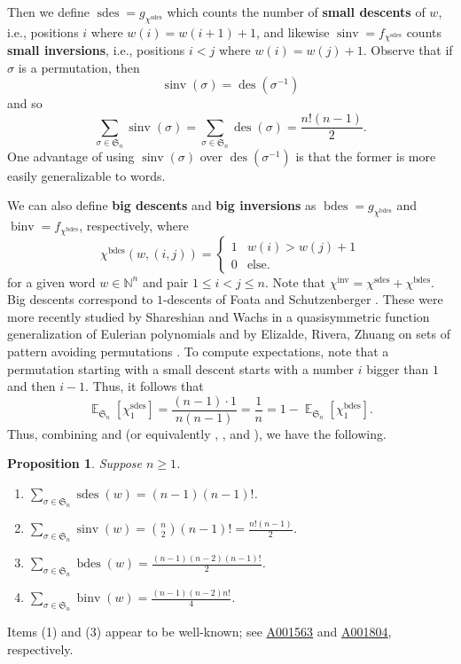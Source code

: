 \documentclass{amsart}
\newcommand{\seqnum}[1]{\href{http://oeis.org/#1}{\underline{#1}}}
\newcommand{\N}{\mathbb{N}}
\renewcommand{\S}{\mathfrak{S}}
\DeclareMathOperator{\des}{des}
\DeclareMathOperator{\inv}{inv}
\DeclareMathOperator{\sinv}{sinv}
\DeclareMathOperator{\sdes}{sdes}
\DeclareMathOperator{\bdes}{bdes}
\DeclareMathOperator{\binv}{binv}
\DeclareMathOperator{\E}{\mathbb{E}}
\newtheorem{proposition}[theorem]{Proposition}
\theoremstyle{definition}
\begin{document}
Then we define $\sdes= g_{\chi^{\sdes}}$
which counts the number of \textbf{small descents} of $w$, i.e., positions $i$ where $w(i)=w(i+1)+1$, and likewise $\sinv=f_{\chi^{\sdes}}$ counts \textbf{small inversions}, i.e., positions $i<j$ where $w(i)=w(j)+1$. Observe that if $\sigma$ is a permutation, then 
\begin{equation}\label{eq:sinv-equals-ides}\sinv(\sigma)=\des(\sigma^{-1})\end{equation}
and so 
\begin{equation}\label{eq:sum-sinv-equals-ides}\sum_{\sigma\in \S_n}\sinv(\sigma)=\sum_{\sigma\in \S_n}\des(\sigma)=\frac{n!(n-1)}{2}.\end{equation}
One advantage of using $\sinv(\sigma)$ over $\des(\sigma^{-1})$ is that the former is more easily generalizable to words. 

We can also define \textbf{big descents} and \textbf{big inversions} as $\bdes=g_{\chi^{\bdes}}$ and $\binv=f_{\chi^{\bdes}}$, respectively, where
\[\chi^{\bdes}(w,(i,j)) =   \begin{cases}
    1 & w(i)>w(j)+1\\
    0 & \text{else.}
\end{cases}  \]
for a given word $w\in \N^n$
and pair $1\leq i<j\leq n$. Note that $\chi^{\inv}=\chi^{\sdes}+\chi^{\bdes}$. 
Big descents correspond to $1$-descents of Foata and Schutzenberger \cite{FoaSch70}. These were more recently studied by Shareshian and Wachs in a quasisymmetric function generalization of Eulerian polynomials \cite{shareshian_eulerian_2010,shareshian_chromatic_2016} and by Elizalde, Rivera, Zhuang on sets of pattern avoiding permutations \cite{elizalde2024countingpatternavoidingpermutationsbig}. 
To compute expectations, note that a permutation starting with a small descent starts with a number $i$ bigger than $1$ and then $i-1$. Thus, it follows that 
\begin{equation}\label{eq:exp-of-1-sdes}\E_{\S_n}[\chi_1^{\sdes}]=\frac{(n-1)\cdot 1}{n(n-1)}=\frac{1}{n}=1-\E_{\S_n}[\chi_1^{\bdes}].\end{equation}
  Thus, combining  and  (or equivalently , , and ), we have the following.
  \begin{proposition} \label{prop:sdes_sinv_bdes_binvSN}
      Suppose $n\geq 1$.
      \begin{enumerate}
          \item $\sum_{\sigma\in \S_n}\sdes(w)=(n-1)(n-1)!$.
          \item $\sum_{\sigma\in \S_n}\sinv(w)=\binom{n}{2}(n-1)!=\frac{n!(n-1)}{2}$.
          \item $\sum_{\sigma\in \S_n}\bdes(w)=\frac{(n-1)(n-2)(n-1)!}{2}$.
          \item $\sum_{\sigma\in \S_n}\binv(w)=\frac{(n-1)(n-2) n!}{4}$.

      \end{enumerate}
  \end{proposition}
Items (1) and (3) appear to be well-known; see \seqnum{A001563} and \seqnum{A001804}, respectively.
\end{document}
